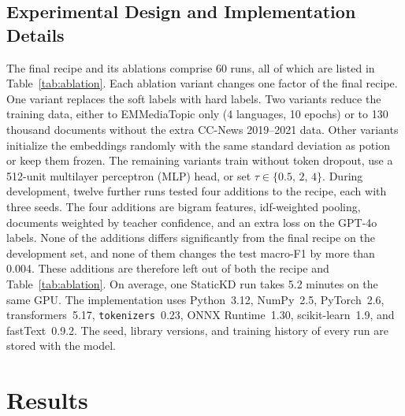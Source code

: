 \documentclass[journal]{IEEEtran}
\begin{document}
\subsection{Experimental Design and Implementation Details}
\label{sec:design}
The final recipe and its ablations comprise 60 runs, all of which are listed in Table~\ref{tab:ablation}. Each ablation variant changes one factor of the final recipe. One variant replaces the soft labels with hard labels. Two variants reduce the training data, either to EMMediaTopic only (4 languages, 10 epochs) or to 130 thousand documents without the extra CC-News 2019--2021 data. Other variants initialize the embeddings randomly with the same standard deviation as potion or keep them frozen. The remaining variants train without token dropout, use a 512-unit multilayer perceptron (MLP) head, or set $\tau\in\{0.5,\,2,\,4\}$. During development, twelve further runs tested four additions to the recipe, each with three seeds. The four additions are bigram features, idf-weighted pooling, documents weighted by teacher confidence, and an extra loss on the GPT-4o labels. None of the additions differs significantly from the final recipe on the development set, and none of them changes the test macro-F1 by more than 0.004. These additions are therefore left out of both the recipe and Table~\ref{tab:ablation}. On average, one StaticKD run takes 5.2 minutes on the same GPU. The implementation uses Python~3.12, NumPy~2.5, PyTorch~2.6, transformers~5.17, \texttt{tokenizers}~0.23, ONNX Runtime~1.30, scikit-learn~1.9, and fastText~0.9.2. The seed, library versions, and training history of every run are stored with the model.

\section{Results}
\label{sec:results}
\end{document}
